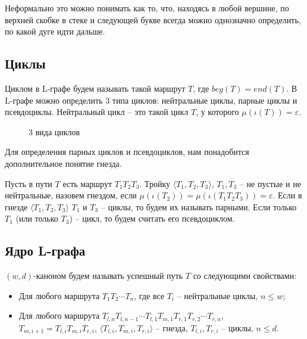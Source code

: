 \documentclass{article}
\begin{document}
Неформально это можно понимать как то, что, находясь в любой вершине, 
по верхней скобке в стеке и следующей букве всегда можно однозначно определить, по какой дуге идти дальше.

\subsection{Циклы}

Циклом в L-графе будем называть такой маршрут $T$, где $beg(T) = end(T)$. В L-графе можно определить 3 типа циклов: нейтральные циклы, парные циклы и псевдоциклы.
Нейтральный цикл -- это такой цикл $T$, у которого $\mu(\iota(T)) = \varepsilon$.

\begin{figure}
    \centering
    \qquad
    \qquad
    \caption{3 вида циклов}
    \label{loop-kinds-example}
\end{figure}


Для определения парных циклов и псевдоциклов, нам понадобится дополнительное понятие гнезда.

Пусть в пути $T$ есть маршрут $T_1 T_2 T_3$. 
Тройку $\langle T_1, T_2, T_3 \rangle$, $T_1, T_3$ -- не пустые и не нейтральные, назовем гнездом, 
если $\mu(\iota(T_2)) = \mu(\iota(T_1 T_2 T_3)) = \varepsilon$.
Если в гнезде $\langle T_1, T_2, T_3 \rangle$ $T_1$ и $T_3$ -- циклы, то будем их называть парными.
Если только $T_1$ (или только $T_3$) -- цикл, то будем считать его псевдоциклом.

\subsection{Ядро L-графа}

$(w,d)$-каноном будем называть успешный путь $T$ со следующими свойствами:
\begin{itemize}
    \item Для любого маршрута $T_1 T_2 \cdots T_n$, где все $T_i$ -- нейтральные циклы, $n \leq w$;
    \item Для любого маршрута $T_{l,n} T_{l,n-1} \cdots T_{l,1} T_{m,1} T_{r,1} T_{r,2} \cdots T_{r,n}$,\\
       $T_{m,i+1} = T_{l,i} T_{m,i} T_{r,i}$, $\langle T_{l,i}, T_{m,i}, T_{r,i} \rangle$ -- гнезда, $T_{l,i}, T_{r,i}$ -- циклы,
       $n \leq d$.
\end{itemize}
\end{document}
